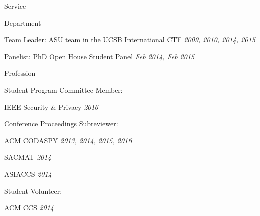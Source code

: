 \begin{rSection}{Service}

  \begin{rSubsection}{Department}

    \item Team Leader: ASU team in the UCSB International CTF \hfill \emph{2009, 2010, 2014, 2015}

    \item Panelist: PhD Open House Student Panel \hfill \emph{Feb 2014, Feb 2015}

  \end{rSubsection}

  \begin{rSubsection}{Profession}

    \item Student Program Committee Member:
      \begin{rBulletList}

        \item IEEE Security \& Privacy \hfill \emph{2016}

      \end{rBulletList}

    \item Conference Proceedings Subreviewer:
      \begin{rBulletList}

        \item ACM CODASPY \hfill \emph{2013, 2014, 2015, 2016}

        \item SACMAT \hfill \emph{2014}

        \item ASIACCS \hfill \emph{2014}

      \end{rBulletList}

    \item Student Volunteer:
      \begin{rBulletList}

        \item ACM CCS \hfill \emph{2014}

      \end{rBulletList}

  \end{rSubsection}


\end{rSection}

